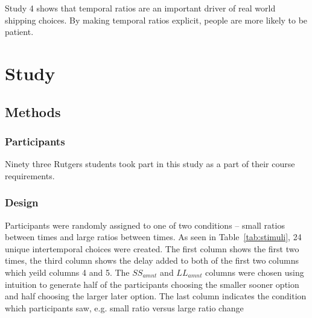 \documentclass[]{article}
\begin{document}
Study 4 shows that temporal ratios are an important driver of real world shipping choices. 
By making temporal ratios explicit, people are more likely to be patient. 

\section{Study}

\subsection{Methods}

\subsubsection{Participants}

Ninety three Rutgers students took part in this study as a part of their course requirements. 

\subsubsection{Design}

Participants were randomly assigned to one of two conditions -- small ratios between times and large ratios between times.  
As seen in Table~\ref{tab:stimuli}, 24 unique intertemporal choices were created. 
The first column shows the first two times, the third column shows the delay added to both of the first two columns which yeild columns 4 and 5. 
The $SS_{amnt}$ and $LL_{amnt}$ columns were chosen using intuition to generate half of the participants choosing the smaller sooner option and half choosing the larger later option. 
The last column indicates the condition which participants saw, e.g. small ratio versus large ratio change
\end{document}
